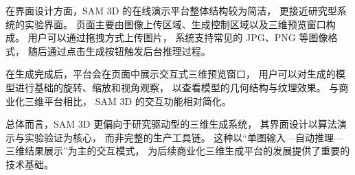 在界面设计方面，SAM 3D 的在线演示平台整体结构较为简洁，
更接近研究型系统的实验界面。
页面主要由图像上传区域、生成控制区域以及三维预览窗口构成。
用户可以通过拖拽方式上传图片，
系统支持常见的 JPG、PNG 等图像格式，
随后通过点击生成按钮触发后台推理过程。 

在生成完成后，平台会在页面中展示交互式三维预览窗口，
用户可以对生成的模型进行基础的旋转、缩放和视角观察，
以查看模型的几何结构与纹理效果。
与商业化三维平台相比，
SAM 3D 的交互功能相对简化。

总体而言，SAM 3D 更偏向于研究驱动型的三维生成系统，
其界面设计以算法演示与实验验证为核心，
而非完整的生产工具链。
这种以“单图输入—自动推理—三维结果展示”为主的交互模式，
为后续商业化三维生成平台的发展提供了重要的技术基础。



